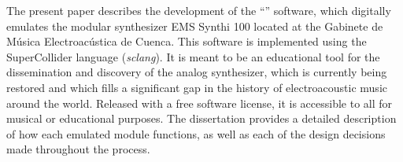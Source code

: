 The present paper describes the development of the “\appName” software, which digitally emulates the modular synthesizer EMS Synthi 100 located at the Gabinete de Música Electroacústica de Cuenca. This software is implemented using the SuperCollider language (\textit{sclang}). It is meant to be an educational tool for the dissemination and discovery of the analog synthesizer, which is currently being restored and which fills a significant gap in the history of electroacoustic music around the world. Released with a free software license, it is accessible to all for musical or educational purposes. The dissertation provides a detailed description of how each emulated module functions, as well as each of the design decisions made throughout the process.
\\[1.5cm]
